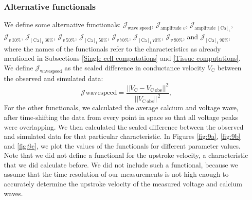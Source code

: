 \documentclass{article}
\begin{document}
\subsubsection{Alternative functionals} \label{Alternative functionals}
We define some alternative functionals: $\mathcal{J}_{\text{wave speed}}$, $\mathcal{J}_{\text{amplitude $v$}}$, $\mathcal{J}_{\text{amplitude $[\mathrm{Ca}]_{\mathrm{i}}$}}$, $\mathcal{J}_{v \:30 \%}$,
$\mathcal{J}_{[\mathrm{Ca}]_{\mathrm{i}} \:30 \%}$, $\mathcal{J}_{v \:50 \%}$,
$\mathcal{J}_{[\mathrm{Ca}]_{\mathrm{i}} \:50 \%}$,  $\mathcal{J}_{v \:70 \%}$,
$\mathcal{J}_{[\mathrm{Ca}]_{\mathrm{i}} \:70 \%}$,  $\mathcal{J}_{v \:90 \%}$, and
$\mathcal{J}_{[\mathrm{Ca}]_{\mathrm{i}} \:90 \%}$, where the names of the functionals refer to the characteristics as already mentioned in Subsections \ref{Single cell computations} and \ref{Tissue computations}. We define $\mathcal{J}_{\mathrm{wave speed}}$ as the scaled difference in conductance velocity $V_{\mathrm{C}}$ between the observed and simulated data:
\begin{equation}
\mathcal{J}{\mathrm{wave speed}} =  \frac{||V_{\mathrm{C}}-V_{\mathrm{C \: obs}}||^2}{||V_{\mathrm{C \: obs}}||^2},\label{J_C}
\end{equation}
For the other functionals, we calculated the average calcium and voltage wave, after time-shifting the data from every point in space so that all voltage peaks were overlapping. We then calculated the scaled difference between the observed and simulated data for that particular characteristic. In Figures \ref{fig:9a}, \ref{fig:9b} and \ref{fig:9c}, we plot the values of the functionals for different parameter values. Note that we did not define a functional for the upstroke velocity, a characteristic that we did calculate before. We did not include such a functional, because we assume that the time resolution of our measurements is not high enough to accurately determine the upstroke velocity of the measured voltage and calcium waves.
\end{document}

